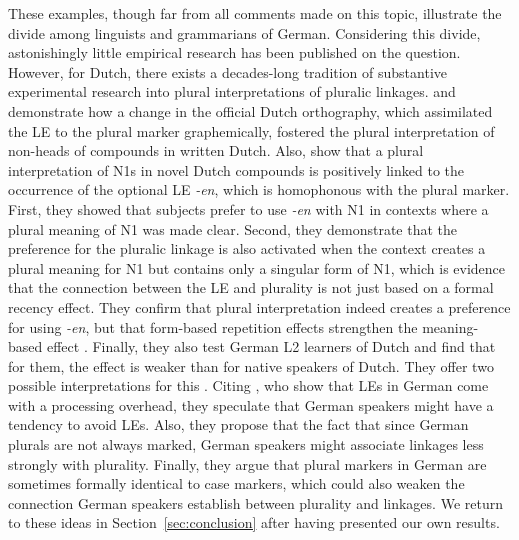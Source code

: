These examples, though far from all comments made on this topic, illustrate the divide among linguists and grammarians of German.
Considering this divide, astonishingly little empirical research has been published on the question.
However, for Dutch, there exists a decades-long tradition of substantive experimental research into plural interpretations of pluralic linkages.
\textcite{SchreuderEa1998} and \textcite{BangaEa2012} demonstrate how a change in the official Dutch orthography, which assimilated the LE to the plural marker graphemically, fostered the plural interpretation of non-heads of compounds in written Dutch.
Also, \textcite{BangaEa2013a} show that a plural interpretation of N1s in novel Dutch compounds is positively linked to the occurrence of the optional LE \textit{-en}, which is homophonous with the plural marker.
First, they showed that subjects prefer to use \textit{-en} with N1 in contexts where a plural meaning of N1 was made clear.
Second, they demonstrate that the preference for the pluralic linkage is also activated when the context creates a plural meaning for N1 but contains only a singular form of N1, which is evidence that the connection between the LE and plurality is not just based on a formal recency effect.
They confirm that plural interpretation indeed creates a preference for using \textit{-en}, but that form-based repetition effects strengthen the meaning-based effect \parencite[45]{BangaEa2013a}.
Finally, they also test German L2 learners of Dutch and find that for them, the effect is weaker than for native speakers of Dutch.
They offer two possible interpretations for this \parencite[45--47]{BangaEa2013a}.
Citing \textcite{LibbenEa2002}, who show that LEs in German come with a processing overhead, they speculate that German speakers might have a tendency to avoid LEs.
Also, they propose that the fact that since German plurals are not always marked, German speakers might associate linkages less strongly with plurality.
Finally, they argue that plural markers in German are sometimes formally identical to case markers, which could also weaken the connection German speakers establish between plurality and linkages.
We return to these ideas in Section~\ref{sec:conclusion} after having presented our own results.

